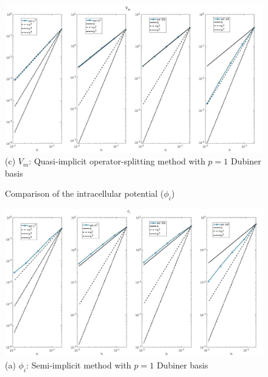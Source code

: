 \documentclass[a4paper,11pt]{article}
\begin{document}
\begin{figure}[h]
\begin{center}
\includegraphics[width =\textwidth]{./errors/D1_Vm_1_OS.jpg}
\caption*{(c) $V_m$: Quasi-implicit operator-splitting method with $p=1$ Dubiner basis}
\end{center}
\end{figure}

\begin{figure}[H]
\caption{Comparison of the intracellular potential ($\phi_i$)}
\label{pi-time}
\begin{center}
\includegraphics[width = \textwidth]{./errors/D1_Phii_1.jpg}
\caption*{(a) $\phi_i$: Semi-implicit method with $p=1$ Dubiner basis}
\end{center}
\end{figure}
\newpage
\end{document}

